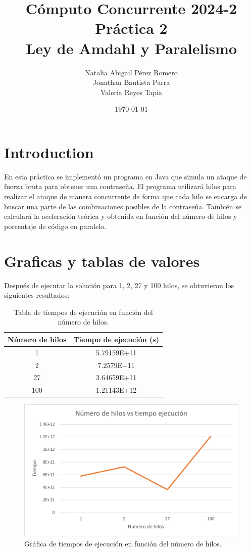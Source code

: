 \documentclass{article}
\title{Cómputo Concurrente 2024-2 \\ Práctica 2 \\  Ley de Amdahl y Paralelismo}
\author{Natalia Abigail Pérez Romero\\
Jonathan Bautista Parra \\ Valeria Reyes Tapia}
\date{\today}
\begin{document}
\maketitle
\section{Introduction}
En esta práctica se implementó un programa en Java que simula un ataque de fuerza bruta para obtener una contraseña. El programa utilizará hilos para realizar el ataque de manera concurrente de forma que cada hilo se encarga de buscar una parte de las combinaciones posibles de la contraseña. También se calculará la aceleración teórica y obtenida en función del número de hilos y porcentaje de código en paralelo.

\section{Graficas y tablas de valores}

Después de ejecutar la solución para 1, 2, 27 y 100 hilos, se obtuvieron los siguientes resultados:

\begin{table}[h]
    \centering
        \begin{tabular}{|c|c|}
            \hline
            \textbf{Número de hilos} & \textbf{Tiempo de ejecución (s)} \\
            \hline
            1 & 5.79159E+11\\
            \hline  
            2 &  7.2579E+11 \\
            \hline
            27 &  3.64659E+11\\
            \hline
            100 &  1.21143E+12\\
            \hline
        \end{tabular}
    \caption{Tabla de tiempos de ejecución en función del número de hilos.}
    \label{tab:tiempos-ejecucion}
\end{table}

\begin{figure}
    \centering
    \includegraphics[width=\textwidth]{diagramaTiempoVSHilos.png}
    \caption{Gráfica de tiempos de ejecución en función del número de hilos.}
    \label{fig:tiempos-ejecucion}
\end{figure}
\end{document}
